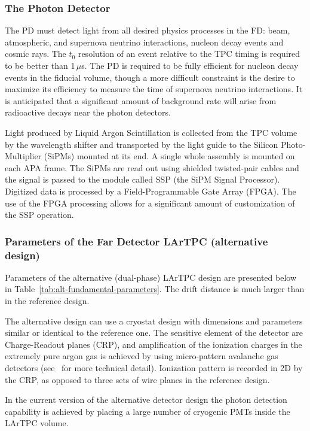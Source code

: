 \subsubsection{The Photon Detector}
\label{sec:pd}
The PD must detect light from all desired physics processes in the FD: beam, atmospheric, and supernova neutrino interactions,
nucleon decay events and cosmic rays.  The $t_0$ resolution of an event relative to the TPC timing is required to be
better than 1\,$\mu$s.  The PD is required to be fully efficient for nucleon decay events in the fiducial volume, though a
more difficult constraint is the desire to maximize its efficiency to measure the time of supernova neutrino interactions.
It is anticipated that a significant amount of background rate will arise from radioactive decays near the photon detectors.

Light produced by Liquid Argon Scintillation is collected from the TPC volume by the wavelength shifter and transported
by the light guide to the Silicon Photo-Multiplier (SiPMs) mounted at its end. A single whole assembly is mounted on each  APA frame.
The SiPMs are read out using shielded twisted-pair cables and the signal is passed to the module called SSP (the SiPM Signal
Processor). Digitized data is processed by a  Field-Programmable Gate Array (FPGA). The use
of the FPGA processing allows for a significant amount of customization of the SSP operation.

\subsubsection{Parameters of the Far Detector LArTPC (alternative design)}
\label{sec:alt-fundamental-parameters}
Parameters of the alternative (dual-phase) LArTPC design are presented below in Table~\ref{tab:alt-fundamental-parameters}.
The drift distance is much larger than in the reference design.

The alternative design can use a cryostat design with dimensions and parameters similar or identical  to the reference one.
The sensitive element of the detector
are Charge-Readout planes (CRP), and amplification of the ionization charges in the extremely pure
argon gas is achieved by using micro-pattern avalanche gas detectors (see~\cite{cdr_vol2} for more technical detail).
Ionization pattern is recorded in 2D by the CRP, as opposed to three sets of wire planes in the reference design.

In the current version of the alternative detector design the photon detection capability is achieved by placing a large number
of cryogenic PMTs inside the LArTPC volume.

